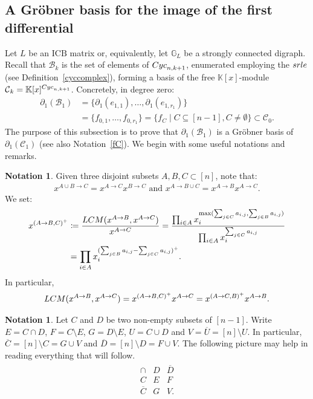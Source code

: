 \documentclass[10pt]{amsart}
\newcommand{\mbk}{\mbox{$\mathbb{K}$}}
\newcommand{\mbg}{\mbox{$\mathbb{G}$}}
\newcommand{\mcb}{\mbox{$\mathcal{B}$}}
\newcommand{\mcc}{\mbox{$\mathcal{C}$}}
\newcommand{\icb}{\mbox{$\mathrm{ICB}$}}
\newcommand{\dif}{\mbox{$\partial$}}
\newcommand{\Lcm}{\mbox{${\rm LCM}$}}
\newcommand{\cyc}{\mbox{${\rm Cyc}$}}
\newcommand{\srle}{\mbox{${\rm srle}$}}
\theoremstyle{definition}
\newtheorem{notation}[cdrthm]{Notation}
\theoremstyle{remark}
\begin{document}
\subsection{A Gr\"obner basis for the image of the first differential}

 Let $L$ be an $\icb$ matrix or, equivalently, let $\mbg_L$
be a strongly connected digraph.  Recall that $\mcb_k$ is the set of
elements of $\cyc_{n,k+1}$, enumerated employing the $\srle$ (see
Definition~\ref{cyccomplex}), forming a basis of the free
$\mbk[x]$-module $\mcc_k=\mbk[x]^{{\rm Cyc}_{n,k+1}}$. Concretely, in
degree zero: 
\begin{align*}
 \dif_1(\mcb_1)&=\{\dif_{1}(e_{1,1}),\ldots ,\dif_{1}(e_{1,r_1})\}\\
&=\{f_{0,1},\ldots,f_{0,r_1}\}=\{f_C\mid C\subseteq [n-1],
C\neq\emptyset\}\subset \mcc_0.
\end{align*}
The purpose of this subsection is to prove that $\dif_1(\mcb_1)$ is a
Gr\"obner basis of $\dif_1(\mcc_1)$ (see also Notation~\ref{fC}). We
begin with some useful notations and remarks.

\begin{notation}\label{lcm-notation}
Given three disjoint subsets $A,B,C\subset [n]$, note that:
\begin{eqnarray}\label{disjoint}
x^{A\cup B\to C}=x^{A\to C}x^{B\to C}\mbox{ and }x^{A\to B\cup
  C}=x^{A\to B}x^{A\to C}.
\end{eqnarray}
We set:
\begin{align}
x^{(A\to B,C)^+} & \coloneqq
\frac{\Lcm(x^{A\to B},x^{A\to C})}{x^{A\to C}}= 
\frac{\prod_{i\in A}x_i^{\max(\sum_{j\in C}a_{i,j},\sum_{j\in B}a_{i,j})}}
{\prod_{i\in A}x_i^{\sum_{j\in C}a_{i,j}}} \\
&=\prod_{i\in A}x_i^{(\sum_{j\in B}a_{i,j}-\sum_{j\in C}a_{i,j})^{+}}. \notag
\end{align}
In particular,
\begin{eqnarray}\label{lcm-equality}
\Lcm(x^{A\to B},x^{A\to C})=x^{(A\to B,C)^+}x^{A\to C}=x^{(A\to C,B)^+}x^{A\to B}.
\end{eqnarray}
\end{notation}

\begin{notation}\label{FG-notation}
Let $C$ and $D$ be two non-empty subsets of $[n-1]$. Write $E=C\cap
D$, $F=C\setminus E$, $G=D\setminus E$, $U=C\cup D$ and
$V=\overline{U}=[n]\setminus U$. In particular,
$\overline{C}=[n]\setminus C=G\cup V$ and $\overline{D}=[n]\setminus
D=F\cup V$.  The following picture may help in reading everything that
will follow.
\begin{eqnarray*}
\begin{array}{c|c|c}
\cap &D&\overline{D}\\\hline
C&E&F\\\hline
\overline{C}&G&V.
\end{array}
\end{eqnarray*}
\end{notation}
\end{document}
